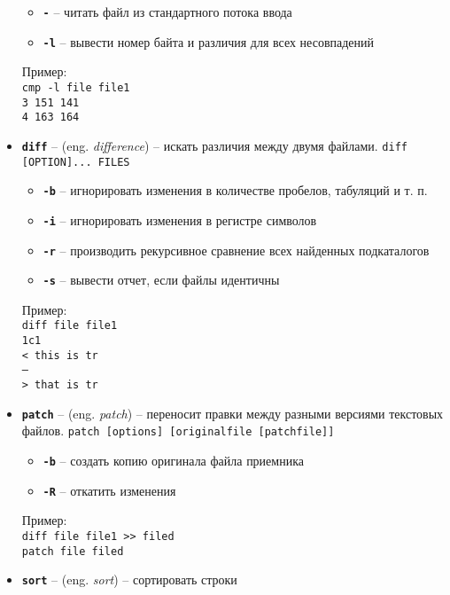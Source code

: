 \documentclass[12pt, a4paper]{article}
\begin{document}
\begin{itemize}
  \begin{itemize}
    \item \textbf{\texttt{-}} -- читать файл из стандартного потока ввода
    \item \textbf{\texttt{-l}} -- вывести номер байта и различия для всех
      несовпадений
  \end{itemize}
  Пример:\\
  \texttt{cmp -l file file1}\\
  \texttt{3 151 141}\\
  \texttt{4 163 164}\\
  \item \textbf{\texttt{diff}} -- (eng. \textit{difference}) -- искать различия
    между двумя файлами.
    \texttt{diff [OPTION]... FILES}
  \begin{itemize}
    \item \textbf{\texttt{-b}} -- игнорировать изменения в количестве пробелов,
     табуляций и т. п.
    \item \textbf{\texttt{-i}} -- игнорировать изменения в регистре символов
    \item \textbf{\texttt{-r}} -- производить рекурсивное сравнение всех
      найденных подкаталогов
    \item \textbf{\texttt{-s}} -- вывести отчет, если файлы идентичны
  \end{itemize}
  Пример:\\
  \texttt{diff file file1}\\
  \texttt{1c1}\\
  \texttt{< this is tr}\\
  \texttt{---}\\
  \texttt{> that is tr}\\
  \item \textbf{\texttt{patch}} -- (eng. \textit{patch}) -- переносит правки 
    между разными версиями текстовых файлов.
    \texttt{patch [options] [originalfile [patchfile]]}
  \begin{itemize}
    \item \textbf{\texttt{-b}} -- создать копию оригинала файла приемника
    \item \textbf{\texttt{-R}} -- откатить изменения
  \end{itemize}
  Пример:\\
  \texttt{diff file file1 >> filed}\\
  \texttt{patch file filed}\\
  \item \textbf{\texttt{sort}} -- (eng. \textit{sort}) -- сортировать строки

\end{itemize}
\end{document}
